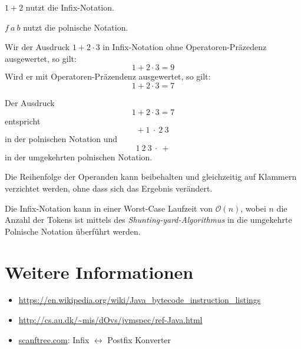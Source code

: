 \begin{beispiel}
    \begin{bspenum}
        \item $1 + 2$ nutzt die Infix-Notation.
        \item $f\ a\ b$ nutzt die polnische Notation.
        \item Wir der Ausdruck $1 + 2 \cdot 3$ in Infix-Notation ohne Operatoren-Präzedenz
              ausgewertet, so gilt: 
              \[1 + 2 \cdot 3 = 9\]
              Wird er mit Operatoren-Präzendenz ausgewertet, so gilt:
              \[1 + 2 \cdot 3 = 7\]
        \item Der Ausdruck
              \[1 + 2 \cdot 3 = 7\]
              entspricht
              \[+\ 1\ \cdot\ 2\ 3\]
              in der polnischen Notation und
              \[1\ 2\ 3\ \cdot\ +\]
              in der umgekehrten polnischen Notation.
    \end{bspenum}
\end{beispiel}

\begin{bemerkung}
    \begin{bemenum}
        \item Die Reihenfolge der Operanden kann beibehalten und gleichzeitig
              auf Klammern verzichtet werden, ohne dass sich das Ergebnis 
              verändert.
        \item Die Infix-Notation kann in einer Worst-Case Laufzeit von $\mathcal{O}(n)$,
              wobei $n$ die Anzahl der Tokens ist mittels des
              \textit{Shunting-yard-Algorithmus} in
              die umgekehrte Polnische Notation überführt werden.
    \end{bemenum}
\end{bemerkung}

\section{Weitere Informationen}
\begin{itemize}
    \item \url{https://en.wikipedia.org/wiki/Java_bytecode_instruction_listings}
    \item \url{http://cs.au.dk/~mis/dOvs/jvmspec/ref-Java.html}
    \item \href{http://scanftree.com/Data_Structure/prefix-postfix-infix-online-converter}{scanftree.com}:
          Infix $\leftrightarrow$ Postfix Konverter
\end{itemize}
